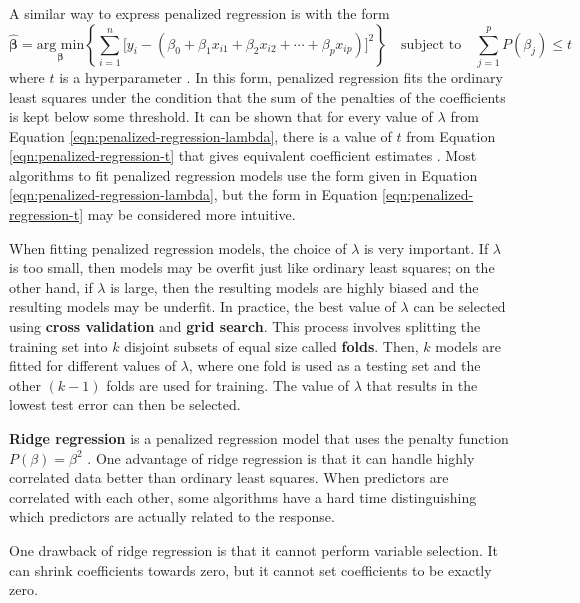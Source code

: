 \documentclass{article}
\newcommand{\argmin}[2]{\underset{#1}{\text{arg min}}\left\{#2\right\}}
\begin{document}
	A similar way to express penalized regression is with the form
	\begin{equation}\label{eqn:penalized-regression-t}
		\hat{\bm{\beta}} = \argmin{\bm{\beta}}{\sum\limits_{i = 1}^n \Big[y_i - (\beta_0 + \beta_1 x_{i1} + \beta_2 x_{i2} + \cdots + \beta_p x_{ip})\Big]^2} \quad \text{subject to} \quad \sum\limits_{j = 1}^p P(\beta_j)\leq t
	\end{equation}
	where $t$ is a hyperparameter \cite{james2013introduction, friedman2001elements}. In this form, penalized regression fits the ordinary least squares under the condition that the sum of the penalties of the coefficients is kept below some threshold. It can be shown that for every value of $\lambda$ from Equation \ref{eqn:penalized-regression-lambda}, there is a value of $t$ from Equation \ref{eqn:penalized-regression-t} that gives equivalent coefficient estimates \cite{james2013introduction}. Most algorithms to fit penalized regression models use the form given in Equation \ref{eqn:penalized-regression-lambda}, but the form in Equation \ref{eqn:penalized-regression-t} may be considered more intuitive.
	
	When fitting penalized regression models, the choice of $\lambda$ is very important. If $\lambda$ is too small, then models may be overfit just like ordinary least squares; on the other hand, if $\lambda$ is large, then the resulting models are highly biased and the resulting models may be underfit. In practice, the best value of $\lambda$ can be selected using \textbf{cross validation} and \textbf{grid search}. This process involves splitting the training set into $k$ disjoint subsets of equal size called \textbf{folds}. Then, $k$ models are fitted for different values of $\lambda$, where one fold is used as a testing set and the other $(k - 1)$ folds are used for training. The value of $\lambda$ that results in the lowest test error can then be selected.
	
	\textbf{Ridge regression} is a penalized regression model that uses the penalty function $P(\beta) = \beta^2$ \cite{hoerl1970ridge}. One advantage of ridge regression is that it can handle highly correlated data better than ordinary least squares. When predictors are correlated with each other, some algorithms have a hard time distinguishing which predictors are actually related to the response.
	
	One drawback of ridge regression is that it cannot perform variable selection. It can shrink coefficients towards zero, but it cannot set coefficients to be exactly zero.
	
\end{document}
